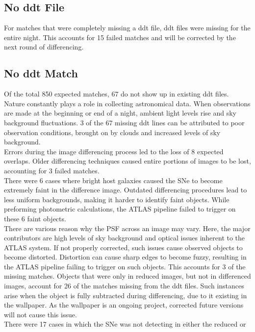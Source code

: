 \subsection{No ddt File}
\indent For matches that were completely missing a ddt file, ddt files were missing 
for the entire night. This accounts for 15 failed matches and will be corrected by 
the next round of differencing.


\subsection{No ddt Match}\label{sec:noddtline}

\indent Of the total 850 expected matches, 67 do not show up in existing ddt files.  
Nature constantly plays a role in collecting astronomical data. When 
observations are made at the beginning or end of a night, ambient light 
levels rise and sky background fluctuations. 3 of the 67 missing ddt 
lines can be attributed to poor observation conditions, brought on by 
clouds and increased levels of sky background.\\
%
\indent Errors during the image differencing process led to the loss of 8 
expected overlaps. Older differencing techniques caused entire portions 
of images to be lost, accounting for 3 failed matches.\\
%
\indent There were 6 cases where bright host galaxies caused the SNe to become extremely 
faint in the difference image. Outdated differencing procedures lead to less 
uniform backgrounds, making it harder to identify faint objects.  
While preforming photometric calculations, the ATLAS pipeline failed to trigger 
on these 6 faint objects.\\
%
\indent There are various reason why the PSF across an image may vary.  
Here, the major contributors are high levels of sky background and optical 
issues inherent to the ATLAS system.  
If not properly corrected, such issues cause observed objects to become distorted.  
Distortion can cause sharp edges to become fuzzy, resulting in the ATLAS pipeline 
failing to trigger on such objects. This accounts for 3 of the missing matches.  
Objects that were only in reduced images, but not in differenced images, account 
for 26 of the matches missing from the ddt files. Such instances arise when the 
object is fully subtracted during differencing, due to it existing in the wallpaper.  
As the wallpaper is an ongoing project, corrected future versions will not cause this issue.\\
%
\indent There were 17 cases in which the SNe was not detecting in either the reduced or 
